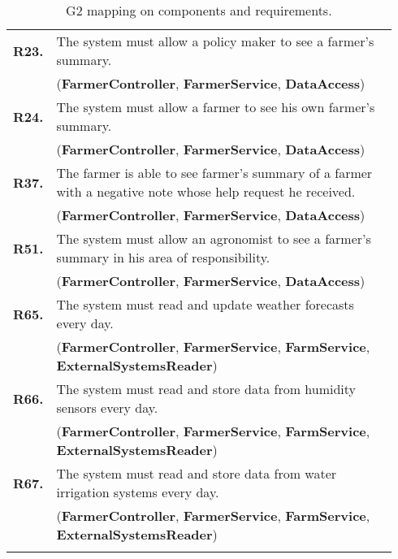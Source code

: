 \begin{longtable}{p{0.06\linewidth} p{0.88\linewidth}}
	\textbf{R23.} & The system must allow a policy maker to see a farmer's summary.\\
	& (\textbf{FarmerController}, \textbf{FarmerService}, \textbf{DataAccess})\\
	
	\textbf{R24.} & The system must allow a farmer to see his own farmer's summary.\\
	& (\textbf{FarmerController}, \textbf{FarmerService}, \textbf{DataAccess})\\
	\textbf{R37.} & The farmer is able to see farmer's summary of a farmer with a negative note whose help request he received. \\
	& (\textbf{FarmerController}, \textbf{FarmerService}, \textbf{DataAccess})\\

	\textbf{R51.} & The system must allow an agronomist to see a farmer's summary in his area of responsibility.\\
	& (\textbf{FarmerController}, \textbf{FarmerService}, \textbf{DataAccess})\\

	\textbf{R65.} & The system must read and update weather forecasts every day. \\
	& (\textbf{FarmerController}, \textbf{FarmerService}, \textbf{FarmService}, \textbf{ExternalSystemsReader})\\
	\textbf{R66.} & The system must read and store data from humidity sensors every day. \\
	& (\textbf{FarmerController}, \textbf{FarmerService}, \textbf{FarmService}, \textbf{ExternalSystemsReader})\\
	\textbf{R67.} & The system must read and store data from water irrigation systems every day. \\
	& (\textbf{FarmerController}, \textbf{FarmerService}, \textbf{FarmService}, \textbf{ExternalSystemsReader})\\
	
    \bottomrule
    \caption{G2 mapping on components and requirements.}
\end{longtable}

